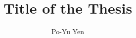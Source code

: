 \documentclass[12pt,oneandahalfspaced, a4paper]{tonic-thesis}
\title{Title of the Thesis}
\author{Po-Yu Yen}
\numberwithin{equation}{chapter} %
\begin{document}
\begin{preliminary}

\begin{abstract}

\end{abstract}

\contents

\end{preliminary}










\begin{postliminary}




\end{postliminary}
\end{document}
